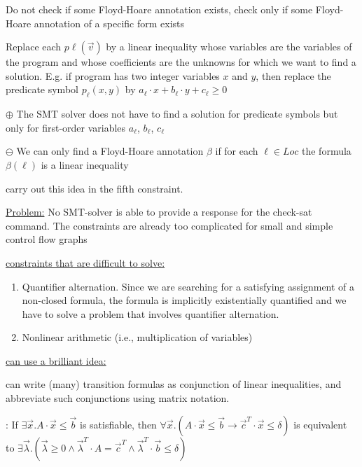 \documentclass[landscape, a4paper]{article}
\begin{document}
\begin{minipage}[t]{0.2\linewidth}
\begin{betterlist}
		\begin{betterlist}
			\item Do not check if some Floyd-Hoare annotation exists, check only if some Floyd-Hoare annotation of a specific form exists
			\item Replace each $p\ell(\vec{v})$ by a linear inequality whose variables are the variables of the program and whose coefficients are the unknowns for which we want to find a solution. E.g. if program has two integer variables $x$ and $y$, then replace the predicate symbol $p_{\ell}(x, y)$ by $a_{\ell} \cdot  x + b_{\ell} \cdot  y + c_{\ell} \geq 0$
			\item $\oplus$ The SMT solver does not have to find a solution for predicate symbols but only for first-order variables $a_{\ell}$, $b_{\ell}$, $c_{\ell}$
			\item $\ominus$ We can only find a Floyd-Hoare annotation $\beta$ if for each $\ell \in Loc$ the formula $\beta (\ell)$ is a linear inequality
			\item carry out this idea in the fifth constraint. 
		\end{betterlist}
		\item \underline{Problem:} No SMT-solver is able to provide a response for the check-sat command. The constraints are already too complicated for small and simple control flow graphs
		\begin{betterlist}
			\item \underline{constraints that are difficult to solve:}
			\begin{enumerate}
				\item Quantifier alternation. Since we are searching for a satisfying assignment of a non-closed formula, the formula is implicitly existentially quantified and we have to solve a problem that involves quantifier alternation.
				\item Nonlinear arithmetic (i.e., multiplication of variables)
			\end{enumerate}
			\item \underline{can use a brilliant idea:}
			\begin{betterlist}
				\item can write (many) transition formulas as conjunction of linear inequalities, and abbreviate such conjunctions using matrix notation. \script{533}{Example}
				\item \color{orange}: If $\exists\vec{x} . A \cdot \vec{x} \leq\vec{b}$ is satisfiable, then $\forall\vec{x} . (A \cdot \vec{x} \leq\vec{b} \rightarrow\vec{c}^T\cdot \vec{x} \leq \delta)$ is equivalent to $\exists\vec{\lambda} . ( \vec{\lambda} \geq 0 \land\vec{\lambda}^T\cdot A =\vec{c}^T\land\vec{\lambda}^T\cdot \vec{b} \leq \delta)$\color{black}

\end{betterlist}
\end{betterlist}
\end{betterlist}
\end{minipage}
\end{document}
